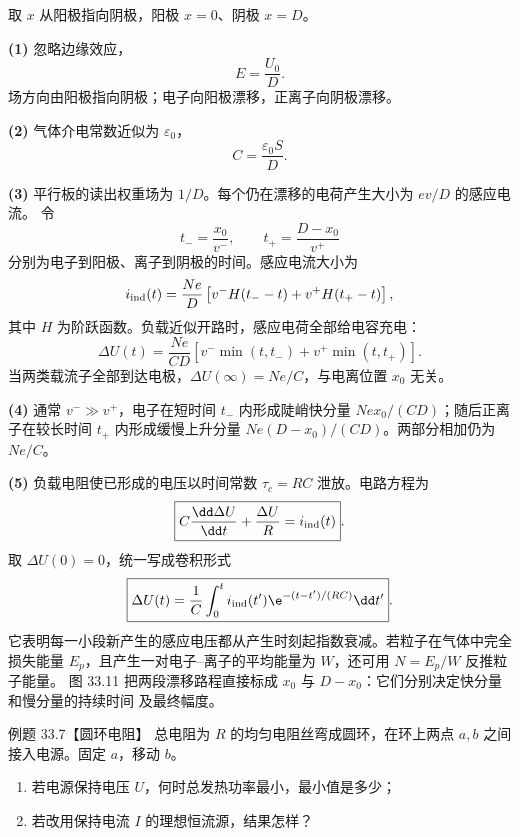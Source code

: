 \begin{xesolution}
取 $x$ 从阳极指向阴极，阳极 $x=0$、阴极 $x=D$。

\textbf{(1)} 忽略边缘效应，
\begin{equation}
  \boxed{E=\frac{U_0}{D}}.
\end{equation}
场方向由阳极指向阴极；电子向阳极漂移，正离子向阴极漂移。

\textbf{(2)} 气体介电常数近似为 $\varepsilon_0$，
\begin{equation}
  \boxed{C=\frac{\varepsilon_0S}{D}}.
\end{equation}

\textbf{(3)} 平行板的读出权重场为 $1/D$。每个仍在漂移的电荷产生大小为 $ev/D$ 的感应电流。
令
\[
  t_- =\frac{x_0}{v^-},
  \qquad
  t_+ =\frac{D-x_0}{v^+}
\]
分别为电子到阳极、离子到阴极的时间。感应电流大小为
\begin{equation}
  i_{\rm ind}(t)=\frac{Ne}{D}
  \left[v^-H(t_--t)+v^+H(t_+-t)\right],
\end{equation}
其中 $H$ 为阶跃函数。负载近似开路时，感应电荷全部给电容充电：
\begin{equation}
  \boxed{\Delta U(t)=\frac{Ne}{CD}\left[
  v^-\min(t,t_-)+v^+\min(t,t_+)\right]}.
\end{equation}
当两类载流子全部到达电极，$\Delta U(\infty)=Ne/C$，与电离位置 $x_0$ 无关。

\textbf{(4)} 通常 $v^-\gg v^+$，电子在短时间 $t_-$ 内形成陡峭快分量
$Ne x_0/(CD)$；随后正离子在较长时间 $t_+$ 内形成缓慢上升分量
$Ne(D-x_0)/(CD)$。两部分相加仍为 $Ne/C$。

\textbf{(5)} 负载电阻使已形成的电压以时间常数 $\tau_c=RC$ 泄放。电路方程为
\begin{equation}
  \boxed{C\frac{\dd\Delta U}{\dd t}+\frac{\Delta U}{R}=i_{\rm ind}(t)}.
\end{equation}
取 $\Delta U(0)=0$，统一写成卷积形式
\begin{equation}
  \boxed{\Delta U(t)=\frac1C\int_0^t
  i_{\rm ind}(t')\e^{-(t-t')/(RC)}\dd t'}.
\end{equation}
它表明每一小段新产生的感应电压都从产生时刻起指数衰减。若粒子在气体中完全损失能量
$E_p$，且产生一对电子--离子的平均能量为 $W$，还可用 $N=E_p/W$ 反推粒子能量。
图 33.11 把两段漂移路程直接标成 $x_0$ 与 $D-x_0$：它们分别决定快分量和慢分量的持续时间
及最终幅度。

\ionChamberDiagram
\end{xesolution}

\Needspace{0.38\textheight}
\begin{origexamplebox}{例题 33.7【圆环电阻】}
总电阻为 $R$ 的均匀电阻丝弯成圆环，在环上两点 $a,b$ 之间接入电源。固定 $a$，移动 $b$。
\begin{enumerate}[label=(\arabic*),leftmargin=2.2em]
  \item 若电源保持电压 $U$，何时总发热功率最小，最小值是多少；
  \item 若改用保持电流 $I$ 的理想恒流源，结果怎样？
\end{enumerate}
\end{origexamplebox}

